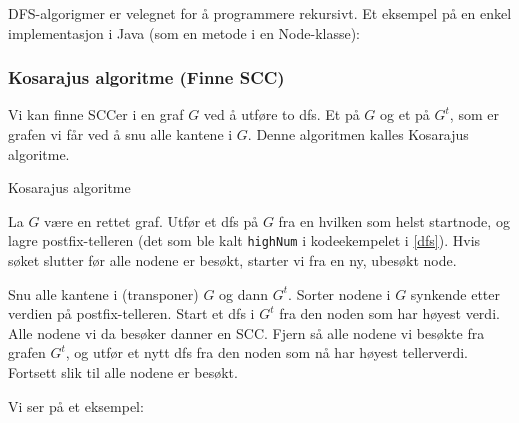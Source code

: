 DFS-algorigmer er velegnet for å programmere rekursivt. Et eksempel på en enkel implementasjon i Java (som en metode i en Node-klasse):



\subsubsection{Kosarajus algoritme (Finne SCC)}
Vi kan finne SCCer i en graf $ G $ ved å utføre to dfs. Et på $ G $ og et på $ G^t $, som er grafen vi får ved å snu alle kantene i $ G $. Denne algoritmen kalles Kosarajus algoritme.

\begin{theorem} Kosarajus algoritme

La $ G $ være en rettet graf. Utfør et dfs på $ G $ fra en hvilken som helst startnode, og lagre postfix-telleren (det som ble kalt \verb|highNum| i kodeekempelet i \ref{dfs}). Hvis søket slutter før alle nodene er besøkt, starter vi fra en ny, ubesøkt node.

Snu alle kantene i (transponer) $ G $ og dann $ G^t $. Sorter nodene i $ G $ synkende etter verdien på postfix-telleren. Start et dfs i $ G^t $ fra den noden som har høyest verdi. Alle nodene vi da besøker danner en SCC. Fjern så alle nodene vi besøkte fra grafen $ G^t $, og utfør et nytt dfs fra den noden som nå har høyest tellerverdi. Fortsett slik til alle nodene er besøkt. 
\end{theorem}


\noindent Vi ser på et eksempel:

